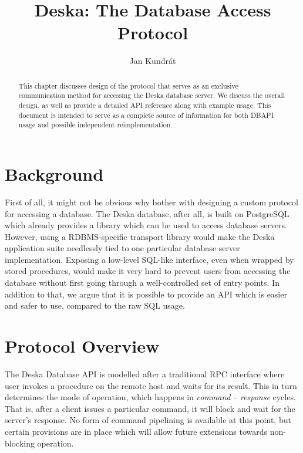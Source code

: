 \documentclass{article}
\begin{document}
\title{Deska: The Database Access Protocol}

\author{Jan Kundrát}

\maketitle

\begin{abstract}
This chapter discusses design of the protocol that serves as an exclusive communication method for accessing the Deska
database server.  We discuss the overall design, as well as provide a detailed API reference along with example usage.
This document is intended to serve as a complete source of information for both DBAPI usage and possible independent
reimplementation.
\end{abstract}

\section{Background}

First of all, it might not be obvious why bother with designing a custom protocol for accessing a database.  The Deska
database, after all, is built on PostgreSQL which already provides a library which can be used to access database
servers.  However, using a RDBMS-specific transport library would make the Deska application suite needlessly tied to
one particular database server implementation.  Exposing a low-level SQL-like interface, even when wrapped by stored
procedures, would make it very hard to prevent users from accessing the database without first going through a
well-controlled set of entry points.  In addition to that, we argue that it is possible to provide an API which is
easier and safer to use, compared to the raw SQL usage.

\section{Protocol Overview}

The Deska Database API is modelled after a traditional RPC interface where user invokes a procedure on the remote host
and waits for its result.  This in turn determines the mode of operation, which happens in {\em command} -- {\em
response} cycles.  That is, after a client issues a particular command, it will block and wait for the server's
response.  No form of command pipelining is available at this point, but certain provisions are in place which will
allow future extensions towards non-blocking operation.
\end{document}
